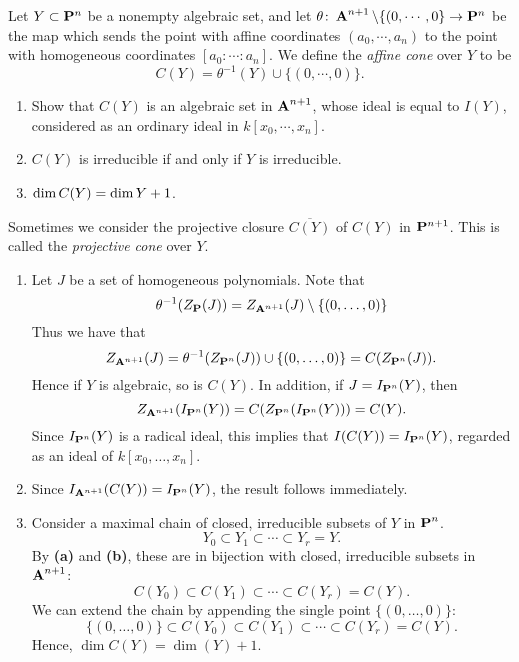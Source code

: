 \documentclass[10pt]{amsart}
\begin{document}
\begin{exercise}[2.10]
    Let $Y \subset \bbP^n$ be a nonempty algebraic set, and let $\theta\colon
    \aa^{n+1} \setminus \{(0,\cdots,0\} \to \bbP^n$ be the map which sends the
    point with affine coordinates $(a_0, \cdots, a_n)$ to the point with
    homogeneous coordinates $[a_0 :\cdots: a_n]$. We define the \emph{affine cone}
    over $Y$ to be $$C(Y) = \theta^{-1}(Y) \cup \{(0,\cdots, 0)\}.$$ 
    \begin{enumerate}
        \item Show that $C(Y)$ is an algebraic set in $\aa^{n+1}$, whose ideal is equal to $I(Y)$, considered as an ordinary ideal in $k[x_0, \cdots, x_n]$. 
        \item $C(Y)$ is irreducible if and only if $Y$ is irreducible. 
        \item $\Dim C(Y) = \Dim Y +1$.
    \end{enumerate}
    Sometimes we consider the projective closure $\overline{C(Y)}$ of $C(Y)$ in
    $\bbP^{n+1}$. This is called the \emph{projective cone} over $Y$.
\end{exercise}

\begin{solution}
    \begin{luke}
        \begin{enumerate}
            \item 
            Let $J$ be a set of homogeneous polynomials. Note that 
            \[
                \theta^{-1}(Z_{\pp}(J)) = Z_{\aa^{n+1}}(J) \setminus\{(0,\dots,0)\}
            \]
            Thus we have that
            \[
                Z_{\aa^{n+1}}(J) = \theta^{-1}(Z_{\pp^n}(J)) \cup \{(0,\dots,0)\} = C(Z_{\pp^n}(J)).
            \]
            Hence if $Y$ is algebraic, so is $C(Y)$. In addition, if $J = I_{\pp^n}(Y)$, then 
            \[
                Z_{\aa^{n+1}}(I_{\pp^n}(Y)) = C(Z_{\pp^n}(I_{\pp^n}(Y))) = C(Y).
            \]
            Since $I_{\pp^n}(Y)$ is a radical ideal, this implies that $I(C(Y)) = I_{\pp^n}(Y)$, regarded 
            as an ideal of $k[x_0, \dots, x_n]$.

            \item Since $I_{\aa^{n+1}}(C(Y)) = I_{\pp^n}(Y)$, the result follows immediately.
            
            \item Consider a maximal chain of closed, irreducible subsets of $Y$ in $\pp^n$. 
            \[
                Y_0 \subset Y_1 \subset \cdots \subset Y_r = Y.
            \]
            By {\bf (a)} and {\bf (b)}, these are in bijection with closed, irreducible 
            subsets in $\aa^{n+1}$:
            \[
                C(Y_0) \subset C(Y_1) \subset \cdots \subset C(Y_r) = C(Y).
            \]
            We can extend the chain by appending the single point $\{(0,\dots, 0)\}$:
            \[
                \{(0, \dots, 0)\} \subset C(Y_0) \subset C(Y_1) \subset \cdots \subset C(Y_r) = C(Y).
            \]
            Hence, $\dim C(Y) = \dim(Y) + 1$. 

        \end{enumerate}
    \end{luke}
\end{solution}
\end{document}
